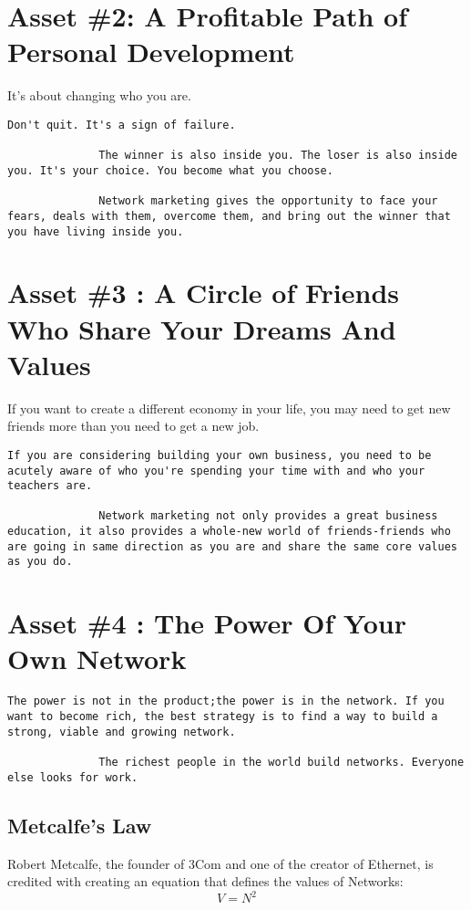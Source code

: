 \documentclass[a4paper, 12pt]{report}
\begin{document}
    \chapter{Asset \#2: A Profitable Path of Personal Development}
    It's about changing who you are.
    \begin{lstlisting}[style=latexFrameTB]
              Don't quit. It's a sign of failure.
              
              The winner is also inside you. The loser is also inside you. It's your choice. You become what you choose.
              
              Network marketing gives the opportunity to face your fears, deals with them, overcome them, and bring out the winner that you have living inside you.
    \end{lstlisting}
    
    \chapter{Asset \#3 : A Circle of Friends Who Share Your Dreams And Values}
    If you want to create a different economy in your life, you may need to get new friends more than you need to get a new job.
    \begin{lstlisting}[style=latexFrameTB]
              If you are considering building your own business, you need to be acutely aware of who you're spending your time with and who your teachers are.
              
              Network marketing not only provides a great business education, it also provides a whole-new world of friends-friends who are going in same direction as you are and share the same core values as you do.
    \end{lstlisting}
    
    \chapter{Asset \#4 : The Power Of Your Own Network}
    \begin{lstlisting}[style=latexFrameTB]
              The power is not in the product;the power is in the network. If you want to become rich, the best strategy is to find a way to build a strong, viable and growing network.
              
              The richest people in the world build networks. Everyone else looks for work.
    \end{lstlisting}
    \section{Metcalfe's Law}
    Robert Metcalfe, the founder of 3Com and one of the creator of Ethernet, is credited with creating an equation that defines the values of Networks:
    \[V=N^2\]
    
\end{document}
